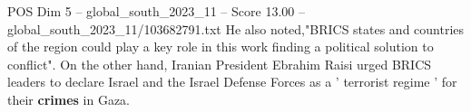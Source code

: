 \begin{textsample}{POS Dim 5 – global\_south\_2023\_11 – Score 13.00 – global\_south\_2023\_11/103682791.txt}
He also noted,"BRICS states and countries of the region could play a key role in this work finding a political solution to conflict".
On the other hand, Iranian President Ebrahim Raisi urged BRICS leaders to declare Israel and the Israel Defense Forces as a ' terrorist regime ' for their \textbf{crimes} in Gaza.

\end{textsample}
